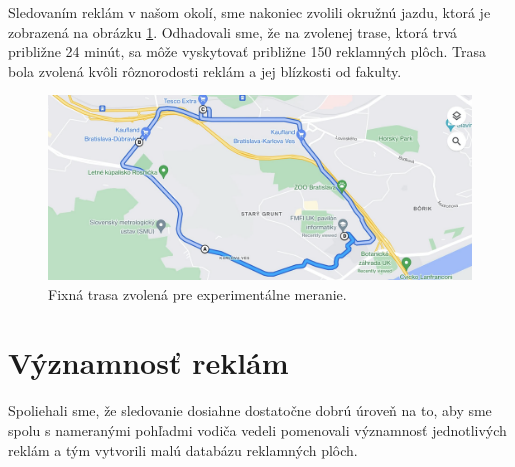 Sledovaním reklám v našom okolí, sme nakoniec zvolili okružnú jazdu, ktorá je zobrazená na obrázku \ref{img:road}. Odhadovali sme, že na zvolenej trase, ktorá trvá približne 24 minút, sa môže vyskytovať približne 150 reklamných plôch. Trasa bola zvolená kvôli rôznorodosti reklám a jej blízkosti od fakulty.
\\
\begin{figure}[ht]
    \centering
    \includegraphics[width=1\textwidth]{images/02/map.png}
    \caption{Fixná trasa zvolená pre experimentálne meranie.}
    \label{img:road}
\end{figure}


\section{Významnosť reklám}

Spoliehali sme, že sledovanie dosiahne dostatočne dobrú úroveň na to, aby sme spolu s nameranými pohľadmi vodiča vedeli pomenovali významnosť jednotlivých reklám a tým vytvorili malú databázu reklamných plôch. 

